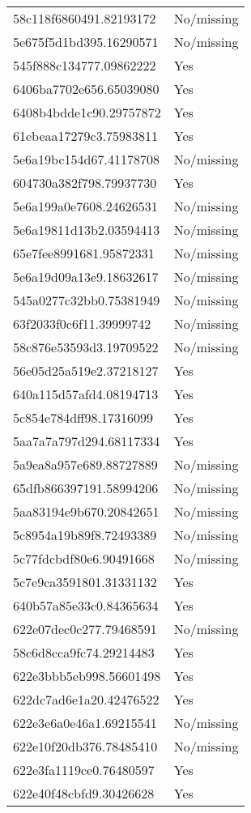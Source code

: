 \begin{tabular}{ll}
58c118f6860491.82193172 & No/missing \\
5e675f5d1bd395.16290571 & No/missing \\
545f888c134777.09862222 & Yes \\
6406ba7702e656.65039080 & Yes \\
6408b4bdde1c90.29757872 & Yes \\
61ebeaa17279c3.75983811 & Yes \\
5e6a19bc154d67.41178708 & No/missing \\
604730a382f798.79937730 & Yes \\
5e6a199a0e7608.24626531 & No/missing \\
5e6a19811d13b2.03594413 & No/missing \\
65e7fee8991681.95872331 & No/missing \\
5e6a19d09a13e9.18632617 & No/missing \\
545a0277c32bb0.75381949 & No/missing \\
63f2033f0c6f11.39999742 & No/missing \\
58c876e53593d3.19709522 & No/missing \\
56e05d25a519e2.37218127 & Yes \\
640a115d57afd4.08194713 & Yes \\
5c854e784dff98.17316099 & Yes \\
5aa7a7a797d294.68117334 & Yes \\
5a9ea8a957e689.88727889 & No/missing \\
65dfb866397191.58994206 & No/missing \\
5aa83194e9b670.20842651 & No/missing \\
5c8954a19b89f8.72493389 & No/missing \\
5c77fdcbdf80e6.90491668 & No/missing \\
5c7e9ca3591801.31331132 & Yes \\
640b57a85e33c0.84365634 & Yes \\
622e07dec0c277.79468591 & No/missing \\
58c6d8cca9fc74.29214483 & Yes \\
622e3bbb5eb998.56601498 & Yes \\
622dc7ad6e1a20.42476522 & Yes \\
622e3e6a0e46a1.69215541 & No/missing \\
622e10f20db376.78485410 & No/missing \\
622e3fa1119ce0.76480597 & Yes \\
622e40f48cbfd9.30426628 & Yes \\

\end{tabular}
